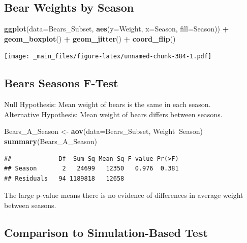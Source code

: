 \documentclass[]{book}
\newenvironment{Shaded}{\begin{snugshade}}{\end{snugshade}}
\newcommand{\KeywordTok}[1]{\textcolor[rgb]{0.13,0.29,0.53}{\textbf{#1}}}
\newcommand{\DataTypeTok}[1]{\textcolor[rgb]{0.13,0.29,0.53}{#1}}
\newcommand{\StringTok}[1]{\textcolor[rgb]{0.31,0.60,0.02}{#1}}
\newcommand{\OperatorTok}[1]{\textcolor[rgb]{0.81,0.36,0.00}{\textbf{#1}}}
\newcommand{\NormalTok}[1]{#1}
\begin{document}
\subsection{Bear Weights by Season}\label{bear-weights-by-season-1}

\begin{Shaded}
\begin{Highlighting}[]
\KeywordTok{ggplot}\NormalTok{(}\DataTypeTok{data=}\NormalTok{Bears_Subset, }\KeywordTok{aes}\NormalTok{(}\DataTypeTok{y=}\NormalTok{Weight, }\DataTypeTok{x=}\NormalTok{Season, }\DataTypeTok{fill=}\NormalTok{Season)) }\OperatorTok{+}\StringTok{ }
\StringTok{   }\KeywordTok{geom_boxplot}\NormalTok{() }\OperatorTok{+}\StringTok{ }\KeywordTok{geom_jitter}\NormalTok{() }\OperatorTok{+}\StringTok{ }\KeywordTok{coord_flip}\NormalTok{()}
\end{Highlighting}
\end{Shaded}

\texttt{[image: \_main\_files/figure-latex/unnamed-chunk-384-1.pdf]}

\subsection{Bears Seasons F-Test}\label{bears-seasons-f-test}

Null Hypothesis: Mean weight of bears is the same in each season.\\
Alternative Hypothesis: Mean weight of bears differs between seasons.

\begin{Shaded}
\begin{Highlighting}[]
\NormalTok{Bears_A_Season <-}\StringTok{ }\KeywordTok{aov}\NormalTok{(}\DataTypeTok{data=}\NormalTok{Bears_Subset, Weight}\OperatorTok{~}\NormalTok{Season)}
\KeywordTok{summary}\NormalTok{(Bears_A_Season)}
\end{Highlighting}
\end{Shaded}

\begin{verbatim}
##             Df  Sum Sq Mean Sq F value Pr(>F)
## Season       2   24699   12350   0.976  0.381
## Residuals   94 1189818   12658
\end{verbatim}

The large p-value means there is no evidence of differences in average
weight between seasons.

\subsection{Comparison to Simulation-Based
Test}\label{comparison-to-simulation-based-test}
\end{document}
